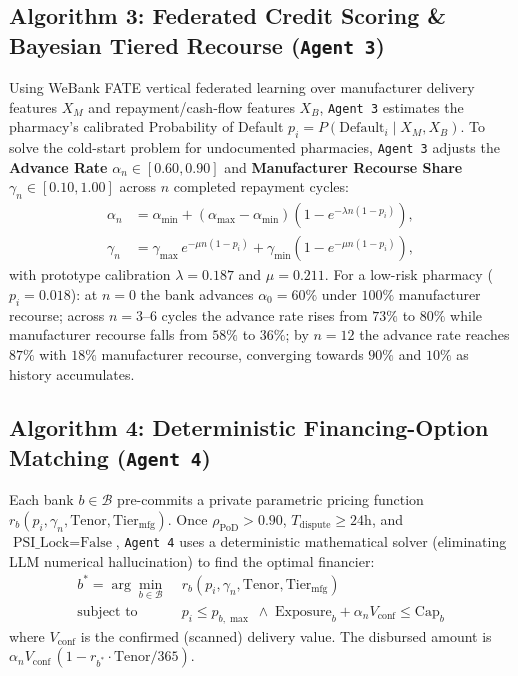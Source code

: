 \documentclass[10pt,a4paper]{article}
\begin{document}
\subsection{Algorithm 3: Federated Credit Scoring \& Bayesian Tiered Recourse (\texttt{Agent 3})}
Using WeBank FATE vertical federated learning over manufacturer delivery features $X_M$ and repayment/cash-flow features $X_B$, \texttt{Agent 3} estimates the pharmacy's calibrated Probability of Default $p_i = P(\text{Default}_i \mid X_M, X_B)$. To solve the cold-start problem for undocumented pharmacies, \texttt{Agent 3} adjusts the \textbf{Advance Rate} $\alpha_n \in [0.60, 0.90]$ and \textbf{Manufacturer Recourse Share} $\gamma_n \in [0.10, 1.00]$ across $n$ completed repayment cycles:
\begin{align}
    \alpha_n &= \alpha_{\min} + (\alpha_{\max} - \alpha_{\min})\left(1 - e^{-\lambda n (1 - p_i)}\right), \\
    \gamma_n &= \gamma_{\max}\, e^{-\mu n (1 - p_i)} + \gamma_{\min}\left(1 - e^{-\mu n (1 - p_i)}\right),
\end{align}
with prototype calibration $\lambda = 0.187$ and $\mu = 0.211$. For a low-risk pharmacy ($p_i = 0.018$): at $n=0$ the bank advances $\alpha_0 = 60\%$ under $100\%$ manufacturer recourse; across $n=3$--$6$ cycles the advance rate rises from $73\%$ to $80\%$ while manufacturer recourse falls from $58\%$ to $36\%$; by $n=12$ the advance rate reaches $87\%$ with $18\%$ manufacturer recourse, converging towards $90\%$ and $10\%$ as history accumulates.

\subsection{Algorithm 4: Deterministic Financing-Option Matching (\texttt{Agent 4})}
Each bank $b \in \mathcal{B}$ pre-commits a private parametric pricing function $r_b(p_i, \gamma_n, \text{Tenor}, \text{Tier}_{\text{mfg}})$. Once $\rho_{\text{PoD}} > 0.90$, $T_{\text{dispute}} \ge 24\text{h}$, and $\text{PSI\_Lock} = \text{False}$, \texttt{Agent 4} uses a deterministic mathematical solver (eliminating LLM numerical hallucination) to find the optimal financier:
\begin{equation}
\begin{aligned}
    b^* = \arg\min_{b \in \mathcal{B}} \;& r_b\left(p_i, \gamma_n, \text{Tenor}, \text{Tier}_{\text{mfg}}\right) \\
    \text{subject to} \;& p_i \le p_{b,\max} \;\land\; \text{Exposure}_b + \alpha_n V_{\text{conf}} \le \text{Cap}_b
\end{aligned}
\end{equation}
where $V_{\text{conf}}$ is the confirmed (scanned) delivery value. The disbursed amount is $\alpha_n V_{\text{conf}}\,(1 - r_{b^*} \cdot \text{Tenor}/365)$.
\end{document}
